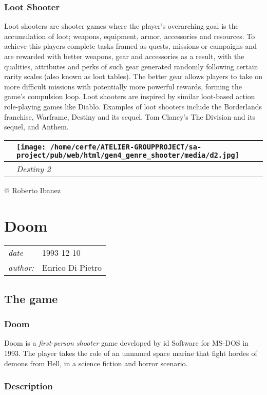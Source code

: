 \documentclass[a4paper,10pt]{book}
\newcommand{\pageHeader}[4]{
    \section{#1}
    \vspace{-0.3cm}
    \begin{table}[h!]
     \begin{tabular}{ll}
        \hline
        \textit{date} & #2 \\
        \textit{author: } & #3\\
        \hline
     \end{tabular}
    \end{table}
    \vspace{-0.3cm}
}
\begin{document}
 \subsubsection{Loot Shooter }
 
            Loot shooters are shooter games where the player's overarching goal is the accumulation of loot; weapons, equipment, armor, accessories and resources. 
            To achieve this players complete tasks framed as quests, missions or campaigns and are rewarded with better weapons, gear and accessories as a result, with the qualities, attributes and perks of such gear generated randomly following certain rarity scales (also known as loot tables). 
            The better gear allows players to take on more difficult missions with potentially more powerful rewards, forming the game's compulsion loop. 
            Loot shooters are inspired by similar loot-based action role-playing games like Diablo.  
            Examples of loot shooters include the Borderlands franchise, Warframe, Destiny and its sequel, Tom Clancy's The Division and its sequel, and Anthem.
           
 \begin{longtable}{p{1mm}|l|}\hline
 
 & \texttt{[image: /home/cerfe/ATELIER-GROUPPROJECT/sa-project/pub/web/html/gen4\_genre\_shooter/media/d2.jpg]}
 \\\hline
 
 & \textit{Destiny 2 }
 \\\hline
 \end{longtable}
 
 @ Roberto Ibanez 
 
 \newpage\pageHeader{Doom}{1993-12-10}{Enrico Di Pietro}{Times change. Doom is eternal.}
 \subsection{The game }
 
 \subsubsection{Doom }
 
          Doom is a  \textit{first-person shooter } game developed by id Software for MS-DOS in
          1993. The player takes the role of an unnamed space marine that fight hordes
          of demons from Hell, in a science fiction and horror scenario.
         
 
 \subsubsection{Description }
 
\end{document}
